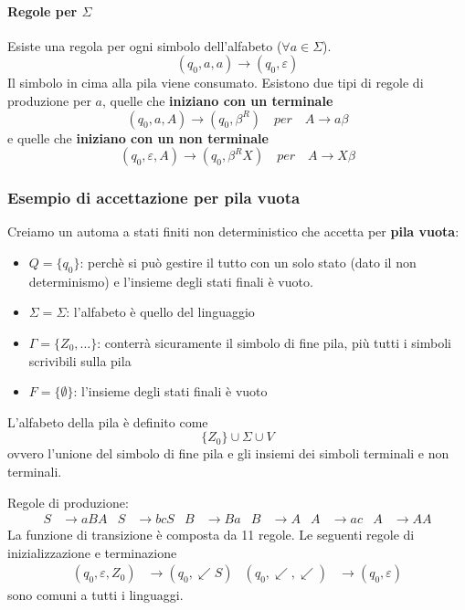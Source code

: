 \documentclass[11pt]{article}
\begin{document}
\paragraph*{Regole per $\Sigma$}
Esiste una regola per ogni simbolo dell'alfabeto ($\forall a\in \Sigma$).
\begin{equation*}
    (q_0,a,a)\rightarrow(q_0,\varepsilon)
\end{equation*}
Il simbolo in cima alla pila viene consumato.
Esistono due tipi di regole di produzione per $a$, quelle che \textbf{iniziano con un terminale} 
\begin{equation*}
    (q_0,a,A)\rightarrow(q_0,\beta^R)\quad per \quad A\rightarrow a\beta
\end{equation*}
e quelle che \textbf{iniziano con un non terminale}
\begin{equation*}
    (q_0,\varepsilon,A)\rightarrow(q_0,\beta^R X)\quad per \quad A\rightarrow X\beta
\end{equation*}
\subsubsection{Esempio di accettazione per pila vuota}
Creiamo un automa a stati finiti non deterministico che accetta per \textbf{pila vuota}:
\begin{itemize}
    \item $Q=\{q_0\}$: perchè si può gestire il tutto con un solo stato (dato il non determinismo) e l'insieme degli stati finali è vuoto.
    \item $\Sigma=\Sigma$: l'alfabeto è quello del linguaggio
    \item $\Gamma=\{Z_0,\dots\}$: conterrà sicuramente il simbolo di fine pila, più tutti i simboli scrivibili sulla pila 
    \item $F=\{\emptyset\}$: l'insieme degli stati finali è vuoto
\end{itemize}

L'alfabeto della pila è definito come
\begin{equation*}
    \{Z_0\}\cup \Sigma \cup V
\end{equation*}
ovvero l'unione del simbolo di fine pila e gli insiemi dei simboli terminali e non terminali.

Regole di produzione:
\begin{align*}
    S&\rightarrow aBA & S&\rightarrow bcS & B&\rightarrow Ba & B&\rightarrow A & A&\rightarrow ac & A&\rightarrow AA
\end{align*}
La funzione di transizione è composta da 11 regole. Le seguenti regole di inizializzazione e terminazione
\begin{align*}
    (q_0,\varepsilon,Z_0)&\rightarrow(q_0,\swarrow S) & (q_0,\swarrow,\swarrow)&\rightarrow(q_0,\varepsilon)
\end{align*}
sono comuni a tutti i linguaggi.
\end{document}
